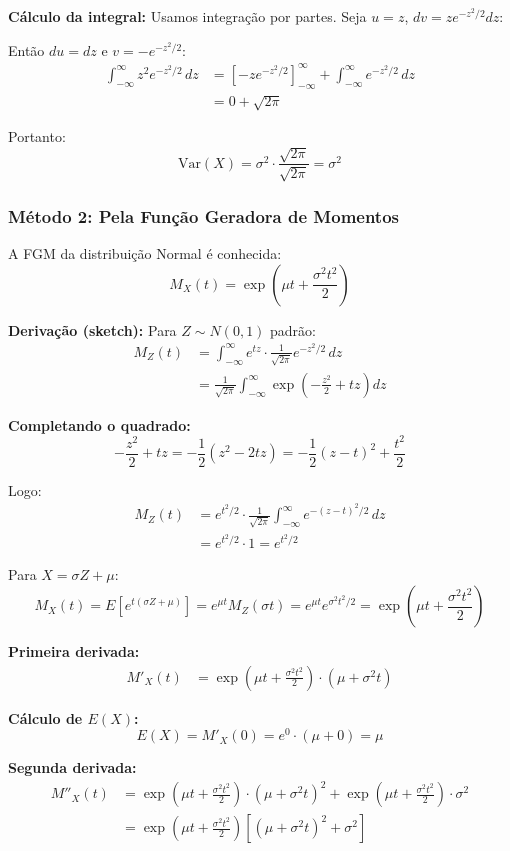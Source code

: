 \documentclass[12pt,a4paper]{article}
\theoremstyle{plain}
\theoremstyle{definition}
\theoremstyle{remark}
\begin{document}
\textbf{Cálculo da integral:} Usamos integração por partes. Seja \(u = z\), \(dv = z e^{-z^2/2} dz\):

Então \(du = dz\) e \(v = -e^{-z^2/2}\):
\begin{align}
\int_{-\infty}^{\infty} z^2 e^{-z^2/2} \, dz &= \left[ -z e^{-z^2/2} \right]_{-\infty}^{\infty} + \int_{-\infty}^{\infty} e^{-z^2/2} \, dz \\
&= 0 + \sqrt{2\pi}
\end{align}

Portanto:
\[
\text{Var}(X) = \sigma^2 \cdot \frac{\sqrt{2\pi}}{\sqrt{2\pi}} = \sigma^2
\]

\subsubsection{Método 2: Pela Função Geradora de Momentos}

A FGM da distribuição Normal é conhecida:
\[
M_X(t) = \exp\left(\mu t + \frac{\sigma^2 t^2}{2}\right)
\]

\textbf{Derivação (sketch):} Para \(Z \sim N(0,1)\) padrão:
\begin{align}
M_Z(t) &= \int_{-\infty}^{\infty} e^{tz} \cdot \frac{1}{\sqrt{2\pi}} e^{-z^2/2} \, dz \\
&= \frac{1}{\sqrt{2\pi}} \int_{-\infty}^{\infty} \exp\left(-\frac{z^2}{2} + tz\right) dz
\end{align}

\textbf{Completando o quadrado:}
\[
-\frac{z^2}{2} + tz = -\frac{1}{2}(z^2 - 2tz) = -\frac{1}{2}(z-t)^2 + \frac{t^2}{2}
\]

Logo:
\begin{align}
M_Z(t) &= e^{t^2/2} \cdot \frac{1}{\sqrt{2\pi}} \int_{-\infty}^{\infty} e^{-(z-t)^2/2} \, dz \\
&= e^{t^2/2} \cdot 1 = e^{t^2/2}
\end{align}

Para \(X = \sigma Z + \mu\):
\[
M_X(t) = E[e^{t(\sigma Z + \mu)}] = e^{\mu t} M_Z(\sigma t) = e^{\mu t} e^{\sigma^2 t^2/2} = \exp\left(\mu t + \frac{\sigma^2 t^2}{2}\right)
\]

\textbf{Primeira derivada:}
\begin{align}
M'_X(t) &= \exp\left(\mu t + \frac{\sigma^2 t^2}{2}\right) \cdot \left(\mu + \sigma^2 t\right)
\end{align}

\textbf{Cálculo de \(E(X)\):}
\[
E(X) = M'_X(0) = e^0 \cdot (\mu + 0) = \mu
\]

\textbf{Segunda derivada:}
\begin{align}
M''_X(t) &= \exp\left(\mu t + \frac{\sigma^2 t^2}{2}\right) \cdot (\mu + \sigma^2 t)^2 + \exp\left(\mu t + \frac{\sigma^2 t^2}{2}\right) \cdot \sigma^2 \\
&= \exp\left(\mu t + \frac{\sigma^2 t^2}{2}\right) \left[(\mu + \sigma^2 t)^2 + \sigma^2\right]
\end{align}
\end{document}
